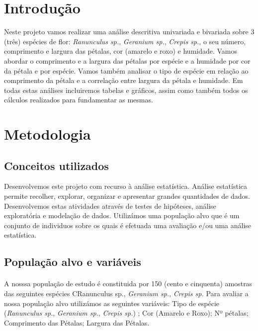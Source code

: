 \documentclass{article}
\begin{document}

\newpage
{}

\tableofcontents

\newpage
{}

\section{Introdução}\label{sec:introducao} %

Neste projeto vamos realizar uma análise descritiva univariada e bivariada sobre 3 (três) espécies de flor: \textit{Ranunculus sp.}, \textit{Geranium sp.}, \textit{Crepis sp.}, o seu número, comprimento e largura das pétalas, cor (amarelo e roxo) e humidade.  
Vamos abordar o comprimento e a largura das pétalas por espécie e a humidade por cor da pétala e por espécie. Vamos também analisar o tipo de espécie em relação ao comprimento da pétala e a correlação entre largura da pétala e humidade. Em todas estas análises incluiremos tabelas e gráficos, assim como também todos os cálculos realizados para fundamentar as mesmas.


\section{Metodologia}\label{sec:metodologia}

\subsection{Conceitos utilizados}
Desenvolvemos este projeto com recurso à análise estatística.
Análise estatística permite recolher, explorar, organizar e apresentar grandes quantidades de dados. Desenvolvemos estas atividades através de testes de hipóteses, análise exploratória e modelação de dados. Utilizámos uma população alvo que é um conjunto de individuos sobre os quais é efetuada uma avaliação e/ou uma análise estatística.
\subsection{População alvo e variáveis}
\paragraph{} A nosssa população de estudo é constituida por 150 (cento e cinquenta) amostras das seguintes espécies C{Ranunculus sp.}, \textit{Geranium sp.}, \textit{Crepis sp.} Para avaliar a nossa população alvo utilizámos as seguintes variáveis: Tipo de espécie (\textit{Ranunculus sp.}, \textit{Geranium sp.}, \textit{Crepis sp.}) ; Cor (Amarelo e Roxo); Nº pétalas; Comprimento das Pétalas; Largura das Pétalas.
\end{document}
